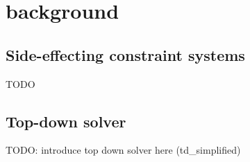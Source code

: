 \section{background}
\label{sec:background}

  \subsection{Side-effecting constraint systems}
  \label{sec:background:constrSys}
  TODO

  \subsection{Top-down solver}
  \label{sec:background:td}
  TODO: introduce top down solver here (td\_simplified)
